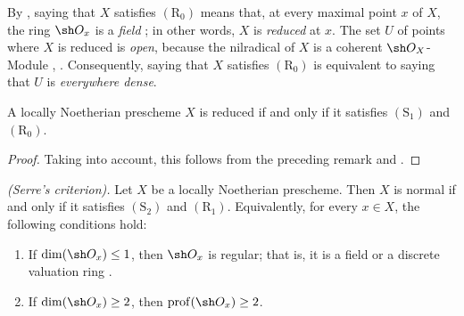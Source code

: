 \begin{env}[5.8.4]
\label{IV.5.8.4}
By , saying that $X$ satisfies $(\mathrm R_0)$ means
that, at every maximal point $x$ of $X$, the ring $\sh O_x$ is a
\emph{field} ; in other words, $X$ is \emph{reduced} at $x$.
The set $U$ of points where $X$ is reduced is \emph{open}, because the
nilradical of $X$ is a coherent $\sh O_X$-Module
, .  Consequently, saying that
$X$ satisfies $(\mathrm R_0)$ is equivalent to saying that $U$ is
\emph{everywhere dense}.
\end{env}


\begin{proposition}[5.8.5]
\label{IV.5.8.5}
A locally Noetherian prescheme $X$ is reduced if and only if it
satisfies $(\mathrm S_1)$ and $(\mathrm R_0)$.
\end{proposition}

\begin{proof}
Taking  into account, this follows from the preceding
remark and .
\end{proof}

\begin{theorem}[5.8.6]
\label{IV.5.8.6}
\emph{(Serre's criterion).}
Let $X$ be a locally Noetherian prescheme.  Then $X$ is normal if and
only if it satisfies $(\mathrm S_2)$ and $(\mathrm R_1)$.  Equivalently,
for every $x\in X$, the following conditions hold:
\begin{enumerate}[{\rm(i)}]
  \item\label{IV.5.8.6.i}
    If $\dim(\sh O_x)\leq1$, then $\sh O_x$ is regular; that is, it is
    a field or a discrete valuation ring .
  \item\label{IV.5.8.6.ii}
    If $\dim(\sh O_x)\geq2$, then
    $\operatorname{prof}(\sh O_x)\geq2$.
\end{enumerate}
\end{theorem}

